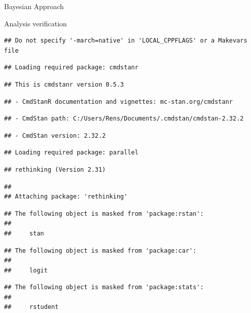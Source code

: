 \documentclass[
  ignorenonframetext,
]{beamer}
\begin{document}
\begin{frame}[fragile]{Bayesian Approach}
\begin{block}{Analysis verification}
\begin{verbatim}
## Do not specify '-march=native' in 'LOCAL_CPPFLAGS' or a Makevars file
\end{verbatim}

\begin{verbatim}
## Loading required package: cmdstanr
\end{verbatim}

\begin{verbatim}
## This is cmdstanr version 0.5.3
\end{verbatim}

\begin{verbatim}
## - CmdStanR documentation and vignettes: mc-stan.org/cmdstanr
\end{verbatim}

\begin{verbatim}
## - CmdStan path: C:/Users/Rens/Documents/.cmdstan/cmdstan-2.32.2
\end{verbatim}

\begin{verbatim}
## - CmdStan version: 2.32.2
\end{verbatim}

\begin{verbatim}
## Loading required package: parallel
\end{verbatim}

\begin{verbatim}
## rethinking (Version 2.31)
\end{verbatim}

\begin{verbatim}
## 
## Attaching package: 'rethinking'
\end{verbatim}

\begin{verbatim}
## The following object is masked from 'package:rstan':
## 
##     stan
\end{verbatim}

\begin{verbatim}
## The following object is masked from 'package:car':
## 
##     logit
\end{verbatim}

\begin{verbatim}
## The following object is masked from 'package:stats':
## 
##     rstudent
\end{verbatim}


\end{block}
\end{frame}
\end{document}
